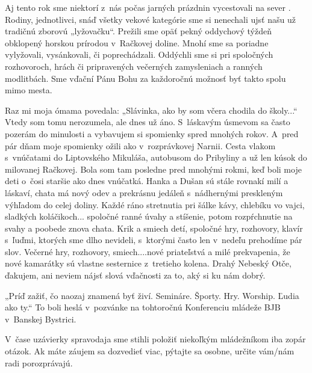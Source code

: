 Aj tento rok sme niektorí z~nás počas jarných prázdnin vycestovali na sever \smiley. Rodiny, jednotlivci, snáď všetky vekové kategórie sme si nenechali ujsť našu už tradičnú zborovú „lyžovačku“.
Prežili sme opäť pekný oddychový týždeň obklopený horskou prírodou v~Račkovej doline. Mnohí sme sa poriadne vylyžovali, vysánkovali, či poprechádzali.
Oddýchli sme si pri spoločných rozhovoroch, hrách či pripravených večerných zamysleniach a ranných modlitbách. Sme vďační Pánu Bohu za každoročnú možnosť byť takto spolu mimo mesta.


Raz mi moja ómama povedala: „Slávinka, ako by som včera chodila do školy...“ Vtedy som tomu nerozumela, ale dnes už áno.
S~láskavým úsmevom sa často pozerám do minulosti a vybavujem si spomienky spred mnohých rokov. A~pred pár dňam moje spomienky ožili ako v~rozprávkovej Narnii.
Cesta vlakom s~vnúčatami do Liptovského Mikuláša, autobusom do Pribyliny a už len kúsok do milovanej Račkovej. Bola som tam posledne pred mnohými rokmi, keď boli moje deti o~čosi staršie ako dnes vnúčatká. Hanka a Dušan sú stále rovnakí milí a láskaví, chata má nový odev a prekrásnu jedáleň s~nádhernými preskleným výhľadom do celej doliny.
Každé ráno stretnutia pri šálke kávy, chlebíku vo vajci, sladkých koláčikoch... spoločné ranné úvahy a stíšenie, potom rozpŕchnutie na svahy a poobede znova chata. Krik a smiech detí, spoločné hry, rozhovory, klavír s~ľuďmi, ktorých sme dlho nevideli, s~ktorými často len v~nedeľu prehodíme pár slov. Večerné hry, rozhovory, smiech....nové priateľstvá a milé prekvapenia, že nové kamarátky sú vlastne sesternice z~tretieho kolena. Drahý Nebeský Otče, ďakujem, ani neviem nájsť slová vďačnosti za to, aký si ku nám dobrý.
\vfill\break


„Príď zažiť, čo naozaj znamená byť živí. Semináre. Športy. Hry. Worship. Ľudia ako ty.“ To boli heslá v~pozvánke na tohtoročnú Konferenciu mládeže BJB v~Banskej Bystrici.

V~čase uzávierky spravodaja sme stihli položiť niekoľkým mládežníkom iba zopár otázok. Ak máte záujem sa dozvedieť viac, pýtajte sa osobne, určite vám/nám radi porozprávajú.

